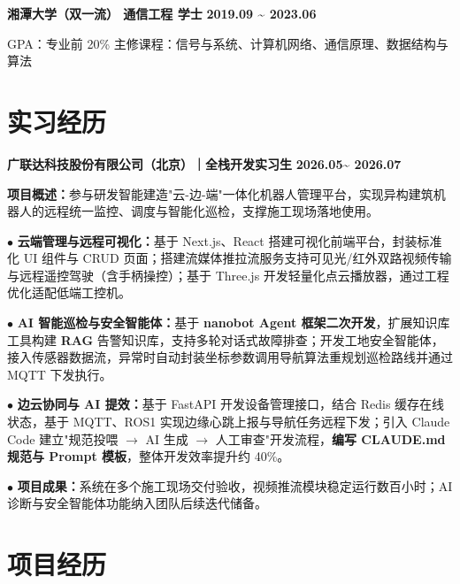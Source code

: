 \documentclass[11pt,a4paper,fontset=none]{ctexart}
\newcommand{\daterange}[1]{{\textbf{#1}}}
\newcommand{\entrytitle}[1]{{\textbf{#1}}}
\begin{document}
\vspace{0.2em}
\noindent
\textbf{湘潭大学（双一流） \quad 通信工程 \quad 学士}
\hfill\textbf{2019.09 \textasciitilde{} 2023.06}

\par\noindent
GPA：专业前 20\% \quad 主修课程：信号与系统、计算机网络、通信原理、数据结构与算法

\section*{实习经历}
\vspace{-0.1em}

\noindent
\entrytitle{广联达科技股份有限公司（北京）｜全栈开发实习生}
\hfill \daterange{2026.05\textasciitilde{} 2026.07}

\par\noindent
 \textbf{项目概述：}参与研发智能建造"云-边-端"一体化机器人管理平台，实现异构建筑机器人的远程统一监控、调度与智能化巡检，支撑施工现场落地使用。

\par\noindent
$\bullet$ \textbf{云端管理与远程可视化：}基于 Next.js、React 搭建可视化前端平台，封装标准化 UI 组件与 CRUD 页面；搭建流媒体推拉流服务支持可见光/红外双路视频传输与远程遥控驾驶（含手柄操控）；基于 Three.js 开发轻量化点云播放器，通过工程优化适配低端工控机。

\par\noindent
$\bullet$ \textbf{AI 智能巡检与安全智能体：}基于 \textbf{nanobot Agent 框架二次开发}，扩展知识库工具构建\textbf{ RAG} 告警知识库，支持多轮对话式故障排查；开发工地安全智能体，接入传感器数据流，异常时自动封装坐标参数调用导航算法重规划巡检路线并通过 MQTT 下发执行。

\par\noindent
$\bullet$ \textbf{边云协同与 AI 提效：}基于 FastAPI 开发设备管理接口，结合 Redis 缓存在线状态，基于 MQTT、ROS1 实现边缘心跳上报与导航任务远程下发；引入 Claude Code 建立"规范投喂 $\rightarrow$ AI 生成 $\rightarrow$ 人工审查"开发流程，\textbf{编写 CLAUDE.md 规范与 Prompt 模板}，整体开发效率提升约 40\%。

\par\noindent
$\bullet$ \textbf{项目成果：}系统在多个施工现场交付验收，视频推流模块稳定运行数百小时；AI 诊断与安全智能体功能纳入团队后续迭代储备。

\section*{项目经历}
\vspace{-0.1em}
\end{document}

